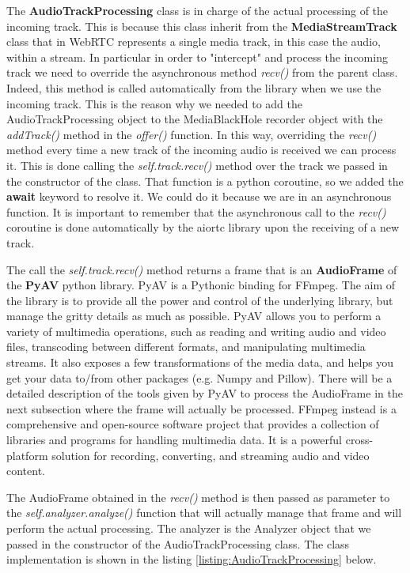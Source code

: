 \documentclass[../main.tex]{subfiles}
\begin{document}
The \textbf{AudioTrackProcessing} class is in charge of the actual processing of the incoming track. This is because this class inherit from the \textbf{MediaStreamTrack} class that in WebRTC represents a single media track, in this case the audio, within a stream. In particular in order to "intercept" and process the incoming track we need to override the asynchronous method \textit{recv()} from the parent class. Indeed, this method is called automatically from the library when we use the incoming track. This is the reason why we needed to add the AudioTrackProcessing object to the MediaBlackHole recorder object with the \textit{addTrack()} method in the \textit{offer()} function. In this way, overriding the \textit{recv()} method every time a new track of the incoming audio is received we can process it. This is done calling the \textit{self.track.recv()} method over the track we passed in the constructor of the class. That function is a python coroutine, so we added the \textbf{await} keyword to resolve it. We could do it because we are in an asynchronous function. It is important to remember that the asynchronous call to the \textit{recv()} coroutine is done automatically by the aiortc library upon the receiving of a new track. 

The call the \textit{self.track.recv()} method returns a frame that is an \textbf{AudioFrame} of the \textbf{PyAV} python library. PyAV is a Pythonic binding for FFmpeg. The aim of the library is to provide all the power and control of the underlying library, but manage the gritty details as much as possible. PyAV allows you to perform a variety of multimedia operations, such as reading and writing audio and video files, transcoding between different formats, and manipulating multimedia streams. It also exposes a few transformations of the media data, and helps you get your data to/from other packages (e.g. Numpy and Pillow). There will be a detailed description of the tools given by PyAV to process the AudioFrame in the next subsection where the frame will actually be processed. FFmpeg instead is a comprehensive and open-source software project that provides a collection of libraries and programs for handling multimedia data. It is a powerful cross-platform solution for recording, converting, and streaming audio and video content.

The AudioFrame obtained in the \textit{recv()} method is then passed as parameter to the \textit{self.analyzer.analyze()} function that will actually manage that frame and will perform the actual processing. The analyzer is the Analyzer object that we passed in the constructor of the AudioTrackProcessing class. The class implementation is shown in the listing \ref{listing:AudioTrackProcessing} below.
\end{document}
